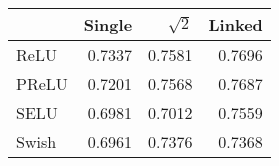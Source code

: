 \begin{tabular}{lrrr}
\toprule
{} &  Single &  $\sqrt{2}$ &  Linked \\
\midrule
ReLU  &  0.7337 &     0.7581 &  0.7696 \\
PReLU &  0.7201 &     0.7568 &  0.7687 \\
SELU  &  0.6981 &     0.7012 &  0.7559 \\
Swish &  0.6961 &     0.7376 &  0.7368 \\
\bottomrule
\end{tabular}
